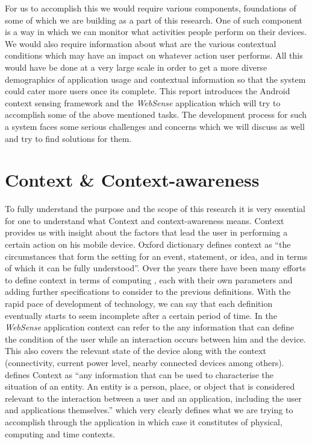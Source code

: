 \documentclass[12pt]{report}
\begin{document}
For us to accomplish this we would require various components, foundations of some of which we are building as a part of this research. One of such component is a way in which we can monitor what activities people perform on their devices. We would also require information about what are the various contextual conditions which may have an impact on whatever action user performs. All this would have be done at a very large scale in order to get a more diverse demographics of application usage and contextual information so that the system could cater more users once its complete. This report introduces the Android context sensing framework and the \textit{WebSense} application which will try to accomplish some of the above mentioned tasks. The development process for such a system faces some serious challenges and concerns which we will discuss as well and try to find solutions for them.

\section{Context \& Context-awareness}
To fully understand the purpose and the scope of this research it is very essential for  one to understand what Context and context-awareness means. Context provides us with insight about the factors that lead the user in performing a certain action on his mobile device. Oxford dictionary defines context as ``the circumstances that form the setting for an event, statement, or idea, and in terms of which it can be fully understood''. Over the years there have been many efforts to define context in terms of computing \cite{schilit1994context,brown1996supporting,prekop2003activities}, each with their own parameters and adding further specifications to consider to the previous definitions. With the rapid pace of development of technology, we can say that each definition eventually starts to seem incomplete after a certain period of time. In the \textit{WebSense} application context can refer to the any information that can define the condition of the user while an interaction occurs between him and the device. This also covers the relevant state of the device along with the context (connectivity, current power level, nearby connected devices among others). \cite{dey2001understanding} defines Context as ``any information that can be used to characterise the situation of an entity. An entity is a person, place, or object that is considered relevant to the interaction between a user and an application, including the user and applications themselves.'' which very clearly defines what we are trying to accomplish through the application in which case it constitutes of physical, computing and time contexts\cite{schilit1994context}.
\end{document}
